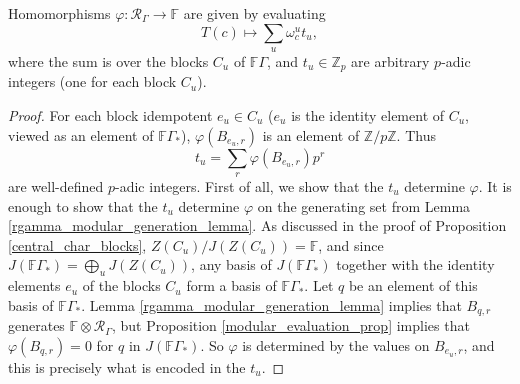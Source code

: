 \documentclass[ALCO,Unicode]{cedram}
\newcommand{\RGamma}{\mathcal{R}_{\Gamma}}
\newcommand{\RGamma}{\mathcal{R}_{\Gamma}}
\begin{document}
\begin{theorem}
Homomorphisms $\varphi: \RGamma \to \mathbb{F}$ are given by evaluating 
\[
T(c) \mapsto \sum_{u} \omega_c^{u} t_u,
\]
where the sum is over the blocks $C_u$ of $\mathbb{F}\Gamma$, and $t_u \in \mathbb{Z}_p$ are arbitrary $p$-adic integers \textup{(}one for each block $C_u$\textup{)}.
\end{theorem}
\begin{proof}
For each block idempotent $e_u \in C_u$ ($e_u$ is the identity element of $C_u$, viewed as an element of $\mathbb{F}\Gamma_*$), $\varphi(B_{e_u, r})$ is an element of $\mathbb{Z}/p\mathbb{Z}$. Thus
\[
t_u = \sum_r \varphi(B_{e_u, r}) p^r
\]
are well-defined $p$-adic integers. First of all, we show that the $t_u$ determine $\varphi$. It is enough to show that the $t_u$ determine $\varphi$ on the generating set from Lemma \ref{rgamma_modular_generation_lemma}. As discussed in the proof of Proposition  \ref{central_char_blocks}, $Z(C_u)/J(Z(C_u)) = \mathbb{F}$, and since $J(\mathbb{F}\Gamma_*) = \bigoplus_u J(Z(C_u))$, any basis of $J(\mathbb{F}\Gamma_*)$ together with the identity elements $e_u$ of the blocks $C_u$ form a basis of $\mathbb{F}\Gamma_*$. Let $q$ be an element of this basis of $\mathbb{F}\Gamma_*$. Lemma \ref{rgamma_modular_generation_lemma} implies that $B_{q,r}$ generates $\mathbb{F} \otimes \RGamma$, but Proposition \ref{modular_evaluation_prop} implies that $\varphi(B_{q,r})=0$ for $q$ in $J(\mathbb{F}\Gamma_*)$. So $\varphi$ is determined by the values on $B_{e_u,r}$, and this is precisely what is encoded in the $t_u$.


\end{proof}
\end{document}
